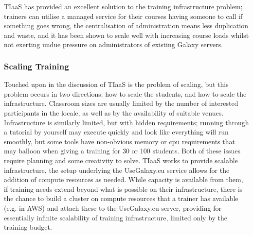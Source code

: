 \documentclass[10pt,letterpaper]{article}
\begin{document}
TIaaS has provided an excellent solution to the training infrastructure problem; trainers can utilise a managed service for their courses having someone to call if something goes wrong, the centralisation of administration means less duplication and waste, and it has been shown to scale well with increasing course loads whilst not exerting undue pressure on administrators of existing Galaxy servers.

\subsubsection*{Scaling Training}
Touched upon in the discussion of TIaaS is the problem of scaling, but this problem occurs in two directions: how to scale the students, and how to scale the infrastructure.
Classroom sizes are usually limited by the number of interested participants in the locale, as well as by the availability of suitable venues.
Infrastructure is similarly limited, but with hidden requirements; running through a tutorial by yourself may execute quickly and look like everything will run smoothly, but some tools have non-obvious memory or cpu requirements that may balloon when giving a training for 30 or 100 students.
Both of these issues require planning and some creativity to solve.
TIaaS works to provide scalable infrastructure, the setup underlying the UseGalaxy.eu service allows for the addition of compute resources as needed.
While capacity is available from them, if training needs extend beyond what is possible on their infrastructure, there is the chance to build a cluster on compute resources that a trainer has available (e.g. in AWS) and attach these to the UseGalaxy.eu server, providing for essentially infinite scalability of training infrastructure, limited only by the training budget.
\end{document}
